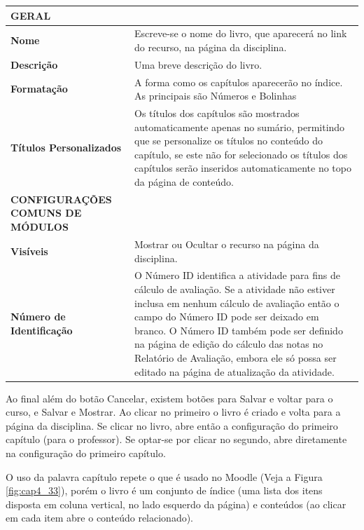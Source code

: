 \begin{table}[htbp]
\begin{flushleft}
    \begin{tabular}{p{6cm}|p{9cm}} \hline
\rowcolor[rgb]{0.8,0.8,0.8} \textbf{GERAL}&\\\hline
\textbf{Nome} & Escreve-se o nome do livro, que aparecerá no link do recurso, na página da disciplina. \\\hline
\textbf{Descrição} & Uma breve descrição do livro. \\\hline
\textbf{Formatação} & A forma como os capítulos aparecerão no índice. As principais são Números e Bolinhas \\\hline
\textbf{Títulos Personalizados}& Os títulos dos capítulos são mostrados automaticamente apenas no sumário, permitindo que se personalize os títulos no conteúdo do capítulo, se este não for selecionado os títulos dos capítulos serão inseridos automaticamente no topo da página de conteúdo. \\\hline
\rowcolor[rgb]{0.8,0.8,0.8} \textbf{CONFIGURAÇÕES COMUNS DE MÓDULOS}&\\\hline
\textbf{Visíveis} & Mostrar ou Ocultar o recurso na página da disciplina. \\\hline
\textbf{Número de Identificação} & O Número ID identifica a atividade para fins de cálculo de avaliação. Se a atividade não estiver inclusa em nenhum cálculo de avaliação então o campo do Número ID pode ser deixado em branco.
O Número ID também pode ser definido na página de edição do cálculo das notas no Relatório de Avaliação, embora ele só possa ser editado na página de atualização da atividade. \\\hline
\end{tabular}
  \end{flushleft}
\end{table}%
Ao final além do botão Cancelar, existem botões para Salvar e voltar para o curso, e Salvar e Mostrar. Ao clicar no primeiro o livro é criado e volta para a página da disciplina. Se clicar no livro, abre então a configuração do primeiro capítulo (para o professor). Se optar-se por clicar no segundo, abre diretamente na configuração do primeiro capítulo.

O uso da palavra capítulo repete o que é usado no Moodle (Veja a Figura \ref{fig:cap4_33}), porém o livro é um conjunto de índice (uma lista dos itens disposta em coluna vertical, no lado esquerdo da página) e conteúdos (ao clicar em cada item abre o conteúdo relacionado).


